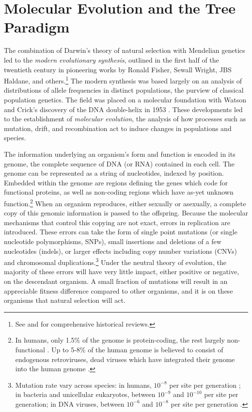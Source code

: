 \section{Molecular Evolution and the Tree Paradigm}

The combination of Darwin's theory of natural selection with Mendelian genetics led to the \emph{modern evolutionary synthesis}, outlined in the first half of the twentieth century in pioneering works by Ronald Fisher, Sewall Wright, JBS Haldane, and others.\footnote{See \cite{Huxley:1942} and \cite{Gould:2002ts} for comprehensive historical reviews.}
The modern synthesis was based largely on an analysis of distributions of allele frequencies in distinct populations, the purview of classical population genetics.
The field was placed on a molecular foundation with Watson and Crick's discovery of the DNA double-helix in 1953 \cite{Watson:1953wm}.
These developments led to the establishment of \emph{molecular evolution}, the analysis of how processes such as mutation, drift, and recombination act to induce changes in populations and species.

The information underlying an organism's form and function is encoded in its genome, the complete sequence of DNA (or RNA) contained in each cell.
The genome can be represented as a string of nucleotides, indexed by position.
Embedded within the genome are regions defining the genes which code for functional proteins, as well as non-coding regions which have as-yet unknown function.\footnote{In humans, only 1.5\% of the genome is protein-coding, the rest largely non-functional \cite{Lander:2001hk}. Up to 5-8\% of the human genome is believed to consist of endogenous retroviruses, dead viruses which have integrated their genome into the human genome \cite{Belshaw:2004gw}.}
When an organism reproduces, either sexually or asexually, a complete copy of this genomic information is passed to the offspring.
Because the molecular mechanisms that control this copying are not exact, errors in replication are introduced.
These errors can take the form of single point mutations (or single nucleotide polymorphisms, SNPs), small insertions and deletions of a few nucleotides (indels), or larger effects including copy number variations (CNVs) and chromosomal duplications.\footnote{Mutation rate vary across species: in humans, $10^{-8}$ per site per generation \cite{Nachman:2000um}; in bacteria and unicellular eukaryotes, between $10^{-9}$ and $10^{-10}$ per site per generation; in DNA viruses, between $10^{-6}$ and $10^{-8}$ per site per generation \cite{Drake:1998kv}.}
Under the neutral theory of evolution, the majority of these errors will have very little impact, either positive or negative, on the descendant organism.
A small fraction of mutations will result in an appreciable fitness difference compared to other organisms, and it is on these organisms that natural selection will act.

